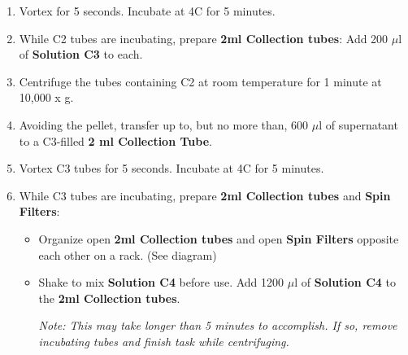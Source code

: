 \documentclass[11pt]{article}
\begin{document}
\begin{enumerate}
\item 
Vortex for 5 seconds. Incubate at 4\degree C for 5 minutes.

\item 
While C2 tubes are incubating, prepare \textbf{2ml Collection tubes}: Add 200 $\mu$l of \textbf{Solution C3} to each.

\item
Centrifuge the tubes containing C2 at room temperature for 1 minute at 10,000 x g.

\item
Avoiding the pellet, transfer up to, but no more than, 600 $\mu$l of supernatant to a C3-filled \textbf{2 ml Collection Tube}.

\item
Vortex C3 tubes for 5 seconds. Incubate at 4\degree C for 5 minutes.

\item
While C3 tubes are incubating, prepare \textbf{2ml Collection tubes} and \textbf{Spin Filters}: 	\begin{itemize}
	\item
	Organize open \textbf{2ml Collection tubes} and open \textbf{Spin Filters} opposite each other on a rack. (See diagram)
	\item
	Shake to mix \textbf{Solution C4} before use. Add 1200 $\mu$l of \textbf{Solution C4} to the \textbf{2ml Collection tubes}. 
	
	\emph{Note: This may take longer than 5 minutes to accomplish. If so, remove incubating tubes and finish task while centrifuging.}
	\end{itemize}


\end{enumerate}
\end{document}
